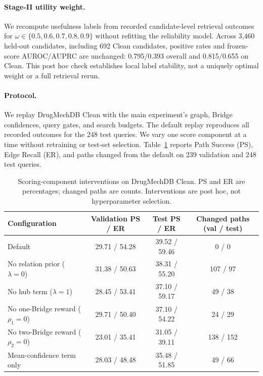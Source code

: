 \documentclass{article} %
\begin{document}
\paragraph{Stage-II utility weight.}
We recompute usefulness labels from recorded candidate-level retrieval outcomes for $\omega\in\{0.5,0.6,0.7,0.8,0.9\}$ without refitting the reliability model. Across 3,460 held-out candidates, including 692 Clean candidates, positive rates and frozen-score AUROC/AUPRC are unchanged: 0.795/0.393 overall and 0.815/0.655 on Clean. This post hoc check establishes local label stability, not a uniquely optimal weight or a full retrieval rerun.

\paragraph{Protocol.}
We replay DrugMechDB Clean with the main experiment's graph, Bridge confidences, query gates, and search budgets. The default replay reproduces all recorded outcomes for the 248 test queries. We vary one score component at a time without retraining or test-set selection. Table~\ref{tab:search_parameter_stress} reports Path Success (PS), Edge Recall (ER), and paths changed from the default on 239 validation and 248 test queries.

\begin{table}[H]
\centering
\small
\caption{Scoring-component interventions on DrugMechDB Clean. PS and ER are percentages; changed paths are counts. Interventions are post hoc, not hyperparameter selection.}
\label{tab:search_parameter_stress}
\begin{tabular}{lccc}
\toprule
Configuration & Validation PS / ER & Test PS / ER & Changed paths (val / test) \\
\midrule
Default & 29.71 / 54.28 & 39.52 / 59.46 & 0 / 0 \\
No relation prior ($\lambda=0$) & 31.38 / 50.63 & 38.31 / 55.20 & 107 / 97 \\
No hub term ($\lambda=1$) & 28.45 / 53.41 & 37.10 / 59.17 & 49 / 38 \\
No one-Bridge reward ($\rho_1=0$) & 29.71 / 50.40 & 37.10 / 54.22 & 24 / 29 \\
No two-Bridge reward ($\rho_2=0$) & 23.01 / 35.41 & 31.05 / 39.11 & 138 / 152 \\
Mean-confidence term only & 28.03 / 48.48 & 35.48 / 51.85 & 49 / 66 \\
\bottomrule
\end{tabular}
\end{table}
\end{document}
